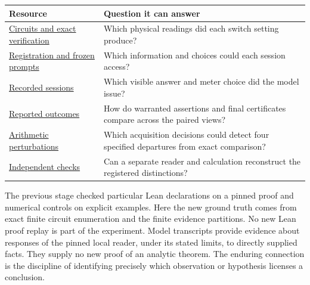 \documentclass[12pt,letterpaper]{article}
\begin{document}
\begin{center}\small
\begin{tabularx}{\linewidth}{@{}lY@{}}\toprule
Resource & Question it can answer\\ \midrule
\href{https://github.com/nousentllc/riemann-hypothesis/tree/experiments/uriel-circuit-threshold-diagnostic/research/uriel/experiments/circuit-threshold-diagnostic/circuits}{Circuits and exact verification} & Which physical readings did each switch setting produce?\\
\href{https://github.com/nousentllc/riemann-hypothesis/tree/experiments/uriel-circuit-threshold-diagnostic/research/uriel/experiments/circuit-threshold-diagnostic/pilot}{Registration and frozen prompts} & Which information and choices could each session access?\\
\href{https://github.com/nousentllc/riemann-hypothesis/tree/experiments/uriel-circuit-threshold-diagnostic/research/uriel/experiments/circuit-threshold-diagnostic/pilot/observed}{Recorded sessions} & Which visible answer and meter choice did the model issue?\\
\href{https://github.com/nousentllc/riemann-hypothesis/tree/experiments/uriel-circuit-threshold-diagnostic/research/uriel/experiments/circuit-threshold-diagnostic/pilot/results}{Reported outcomes} & How do warranted assertions and final certificates compare across the paired views?\\
\href{https://github.com/nousentllc/riemann-hypothesis/tree/experiments/uriel-circuit-threshold-diagnostic/research/uriel/experiments/circuit-threshold-diagnostic/arithmetic-controls}{Arithmetic perturbations} & Which acquisition decisions could detect four specified departures from exact comparison?\\
\href{https://github.com/nousentllc/riemann-hypothesis/tree/experiments/uriel-circuit-threshold-diagnostic/research/uriel/experiments/circuit-threshold-diagnostic/audit}{Independent checks} & Can a separate reader and calculation reconstruct the registered distinctions?\\ \bottomrule
\end{tabularx}
\end{center}

The previous stage checked particular Lean declarations on a pinned proof and numerical controls on explicit examples. Here the new ground truth comes from exact finite circuit enumeration and the finite evidence partitions. No new Lean proof replay is part of the experiment. Model transcripts provide evidence about responses of the pinned local reader, under its stated limits, to directly supplied facts. They supply no new proof of an analytic theorem. The enduring connection is the discipline of identifying precisely which observation or hypothesis licenses a conclusion.
\end{document}

